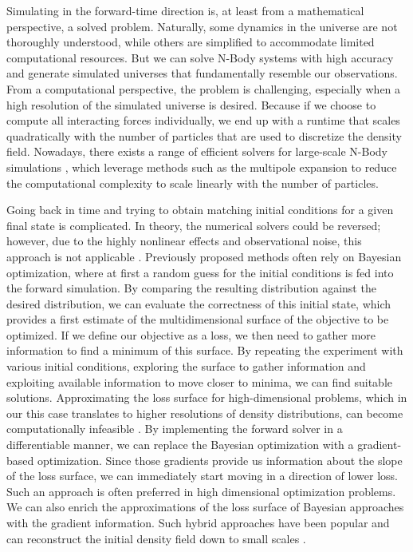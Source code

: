 \documentclass{article}
\begin{document}
Simulating in the forward-time direction is, at least from a mathematical perspective, a solved problem. Naturally, some dynamics in the universe are not thoroughly understood, while others are simplified to accommodate limited computational resources. But we can solve N-Body systems with high accuracy and generate simulated universes that fundamentally resemble our observations. From a computational perspective, the problem is challenging, especially when a high resolution of the simulated universe is desired. Because if we choose to compute all interacting forces individually, we end up with a runtime that scales quadratically with the number of particles that are used to discretize the density field. Nowadays, there exists a range of efficient solvers for large-scale N-Body simulations \citep{potter2017pkdgrav3, springel2021simulating, garrison2021abacus}, which leverage methods such as the multipole expansion to reduce the computational complexity to scale linearly with the number of particles. 

Going back in time and trying to obtain matching initial conditions for a given final state is complicated. In theory, the numerical solvers could be reversed; however, due to the highly nonlinear effects and observational noise, this approach is not applicable \citep{jasche2013bayesian}. Previously proposed methods often rely on Bayesian optimization, where at first a random guess for the initial conditions is fed into the forward simulation. By comparing the resulting distribution against the desired distribution, we can evaluate the correctness of this initial state, which provides a first estimate of the multidimensional surface of the objective to be optimized. If we define our objective as a loss, we then need to gather more information to find a minimum of this surface. By repeating the experiment with various initial conditions, exploring the surface to gather information and exploiting available information to move closer to minima, we can find suitable solutions. Approximating the loss surface for high-dimensional problems, which in our this case translates to higher resolutions of density distributions, can become computationally infeasible \citep{djolonga2013high}. By implementing the forward solver in a differentiable manner, we can replace the Bayesian optimization with a gradient-based optimization. Since those gradients provide us information about the slope of the loss surface, we can immediately start moving in a direction of lower loss. Such an approach is often preferred in high dimensional optimization problems. We can also enrich the approximations of the loss surface of Bayesian approaches with the gradient information. Such hybrid approaches have been popular and can reconstruct the initial density field down to small scales \citep{wang2014elucid}.
\end{document}
